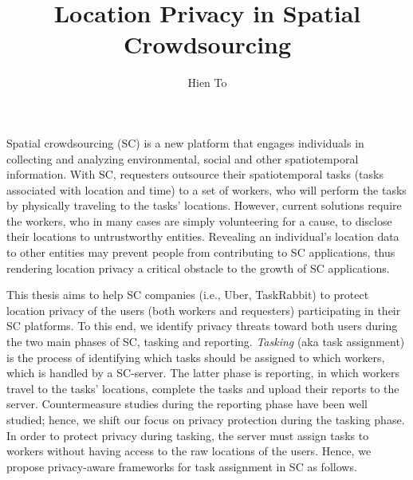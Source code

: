 \documentclass{USC-Thesis}
\title{Location Privacy in Spatial Crowdsourcing}
\author{Hien To}
\numberwithin{equation}{chapter}
\begin{document}

\maketitle




\tableofcontents  %
\listoftables     %
\listoffigures    %


Spatial crowdsourcing (SC) is a new platform that engages individuals in collecting and analyzing environmental, social and other spatiotemporal information. With SC, requesters outsource their spatiotemporal tasks (tasks associated with location and time) to a set of workers, who will perform the tasks by physically traveling to the tasks' locations. However, current solutions require the workers, who in many cases are simply volunteering for a cause, to disclose their locations to untrustworthy entities. Revealing an individual's location data to other entities may prevent people from contributing to SC applications, thus rendering location privacy a critical obstacle to the growth of SC applications.

This thesis aims to help SC companies (i.e., Uber, TaskRabbit) to protect location privacy of the users (both workers and requesters) participating in their SC platforms. To this end, we identify privacy threats toward both users during the two main phases of SC, tasking and reporting. \emph{Tasking} (aka task assignment) is the process of identifying which tasks should be assigned to which workers, which is handled by a SC-server. The latter phase is reporting, in which workers travel to the tasks' locations, complete the tasks and upload their reports to the server. Countermeasure studies during the reporting phase have been well studied; hence, we shift our focus on privacy protection during the tasking phase. In order to protect privacy during tasking, the server must assign tasks to workers without having access to the raw locations of the users. Hence, we propose privacy-aware frameworks for task assignment in SC as follows.
\end{document}
